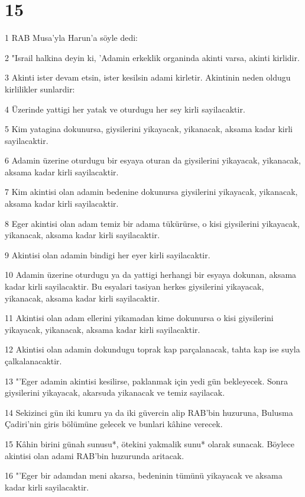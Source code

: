 \chapter{15}

\par 1 RAB Musa'yla Harun'a söyle dedi:
\par 2 "Israil halkina deyin ki, 'Adamin erkeklik organinda akinti varsa, akinti kirlidir.
\par 3 Akinti ister devam etsin, ister kesilsin adami kirletir. Akintinin neden oldugu kirlilikler sunlardir:
\par 4 Üzerinde yattigi her yatak ve oturdugu her sey kirli sayilacaktir.
\par 5 Kim yatagina dokunursa, giysilerini yikayacak, yikanacak, aksama kadar kirli sayilacaktir.
\par 6 Adamin üzerine oturdugu bir esyaya oturan da giysilerini yikayacak, yikanacak, aksama kadar kirli sayilacaktir.
\par 7 Kim akintisi olan adamin bedenine dokunursa giysilerini yikayacak, yikanacak, aksama kadar kirli sayilacaktir.
\par 8 Eger akintisi olan adam temiz bir adama tükürürse, o kisi giysilerini yikayacak, yikanacak, aksama kadar kirli sayilacaktir.
\par 9 Akintisi olan adamin bindigi her eyer kirli sayilacaktir.
\par 10 Adamin üzerine oturdugu ya da yattigi herhangi bir esyaya dokunan, aksama kadar kirli sayilacaktir. Bu esyalari tasiyan herkes giysilerini yikayacak, yikanacak, aksama kadar kirli sayilacaktir.
\par 11 Akintisi olan adam ellerini yikamadan kime dokunursa o kisi giysilerini yikayacak, yikanacak, aksama kadar kirli sayilacaktir.
\par 12 Akintisi olan adamin dokundugu toprak kap parçalanacak, tahta kap ise suyla çalkalanacaktir.
\par 13 "'Eger adamin akintisi kesilirse, paklanmak için yedi gün bekleyecek. Sonra giysilerini yikayacak, akarsuda yikanacak ve temiz sayilacak.
\par 14 Sekizinci gün iki kumru ya da iki güvercin alip RAB'bin huzuruna, Bulusma Çadiri'nin giris bölümüne gelecek ve bunlari kâhine verecek.
\par 15 Kâhin birini günah sunusu*, ötekini yakmalik sunu* olarak sunacak. Böylece akintisi olan adami RAB'bin huzurunda aritacak.
\par 16 "'Eger bir adamdan meni akarsa, bedeninin tümünü yikayacak ve aksama kadar kirli sayilacaktir.
